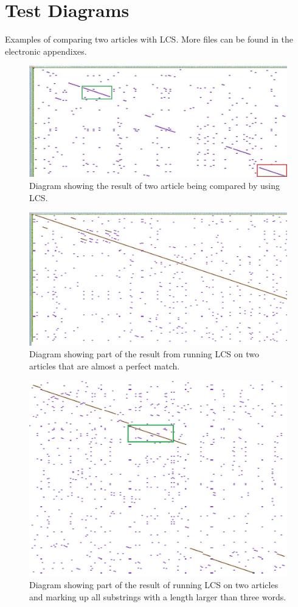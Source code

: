 \chapter{Test Diagrams}

Examples of comparing two articles with LCS. More files can be found in the electronic appendixes.

\begin{figure}
	\includegraphics[scale=0.65]{figures/LcsExample}
	\caption{Diagram showing the result of two article being compared by using LCS.}
\end{figure}

\begin{figure}
	\includegraphics[scale=0.5]{figures/PerfectMatch}
	\caption{Diagram showing part of the result from running LCS on two articles that are almost a perfect match.}
\end{figure}

\begin{figure}
	\includegraphics[scale=0.5]{figures/SubstringCollection}
	\caption{Diagram showing part of the result of running LCS on two articles and marking up all substrings with a length larger than three words.}
	\end{figure}